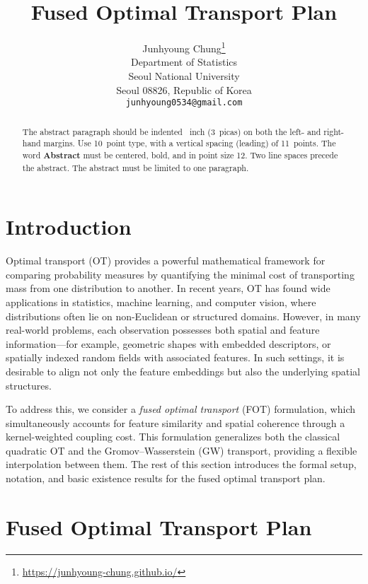 \documentclass{article}
\title{Fused Optimal Transport Plan}
\author{%
  Junhyoung Chung\thanks{\href{https://junhyoung-chung.github.io/}{https://junhyoung-chung.github.io/}} \\
  Department of Statistics\\
  Seoul National University\\
  Seoul 08826, Republic of Korea \\
  \texttt{junhyoung0534@gmail.com} \\
}
\begin{document}
\maketitle


\begin{abstract}
  The abstract paragraph should be indented ~inch (3~picas) on
  both the left- and right-hand margins. Use 10~point type, with a vertical
  spacing (leading) of 11~points.  The word \textbf{Abstract} must be centered,
  bold, and in point size 12. Two line spaces precede the abstract. The abstract
  must be limited to one paragraph.
\end{abstract}


\section{Introduction}

Optimal transport (OT) provides a powerful mathematical framework for comparing probability measures by quantifying the minimal cost of transporting mass from one distribution to another. In recent years, OT has found wide applications in statistics, machine learning, and computer vision, where distributions often lie on non-Euclidean or structured domains. However, in many real-world problems, each observation possesses both spatial and feature information---for example, geometric shapes with embedded descriptors, or spatially indexed random fields with associated features. In such settings, it is desirable to align not only the feature embeddings but also the underlying spatial structures.

To address this, we consider a \emph{fused optimal transport} (FOT) formulation, which simultaneously accounts for feature similarity and spatial coherence through a kernel-weighted coupling cost. This formulation generalizes both the classical quadratic OT and the Gromov--Wasserstein (GW) transport, providing a flexible interpolation between them. The rest of this section introduces the formal setup, notation, and basic existence results for the fused optimal transport plan.

\section{Fused Optimal Transport Plan}

\end{document}
